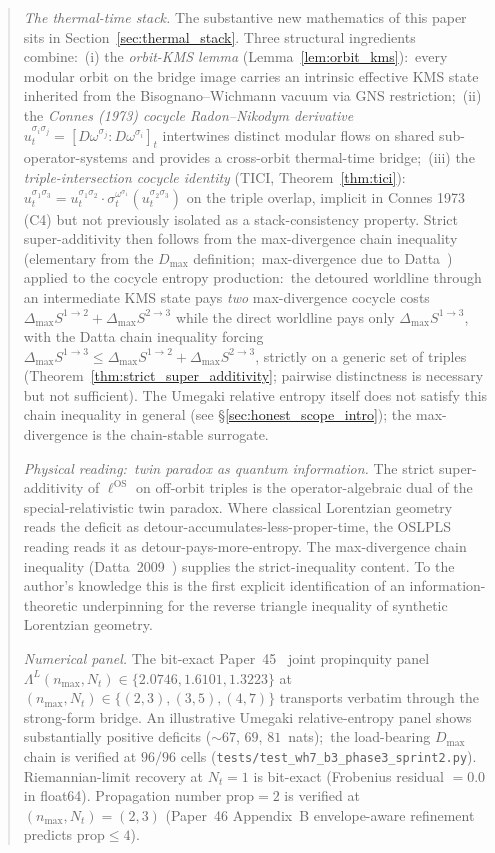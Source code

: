 \documentclass[11pt,a4paper]{article}
\theoremstyle{plain}
\theoremstyle{definition}
\newcommand{\nmax}{n_{\max}}
\newcommand{\Nt}{N_{t}}
\newcommand{\Lprop}{\Lambda^{L}}
\newcommand{\ellOS}{\ell^{\mathrm{OS}}}
\newcommand{\omegaOrb}[1]{\omega^{\sigma_{#1}}}
\newcommand{\cocyc}[2]{u_{t}^{\sigma_{#1}\sigma_{#2}}}
\begin{document}
\begin{abstract}
\noindent\emph{The thermal-time stack.} The substantive new mathematics
of this paper sits in Section~\ref{sec:thermal_stack}. Three structural
ingredients combine:\ (i) the \emph{orbit-KMS lemma}
(Lemma~\ref{lem:orbit_kms}):\ every modular orbit on the bridge image
carries an intrinsic effective KMS state inherited from the
Bisognano--Wichmann vacuum via GNS restriction;\ (ii) the
\emph{Connes (1973) cocycle Radon--Nikodym
derivative}~\cite{connes1973} $\cocyc{i}{j}=[D\omegaOrb{j}:D\omegaOrb{i}]_{t}$
intertwines distinct modular flows on shared sub-operator-systems and
provides a cross-orbit thermal-time bridge;\ (iii) the
\emph{triple-intersection cocycle identity} (TICI,
Theorem~\ref{thm:tici}):\
$\cocyc{1}{3}=\cocyc{1}{2}\cdot\sigma_{t}^{\omegaOrb{1}}(\cocyc{2}{3})$
on the triple overlap, implicit in Connes 1973 (C4) but not previously
isolated as a stack-consistency property. Strict super-additivity then
follows from the max-divergence chain inequality (elementary from the
$D_{\max}$ definition;\ max-divergence due to Datta~\cite{datta2009}) applied to the cocycle
entropy production:\ the detoured worldline through an intermediate
KMS state pays \emph{two} max-divergence cocycle costs
$\Delta_{\max}S^{1\to 2}+\Delta_{\max}S^{2\to 3}$ while the direct
worldline pays only $\Delta_{\max}S^{1\to 3}$, with the Datta chain
inequality forcing
$\Delta_{\max}S^{1\to 3}\le\Delta_{\max}S^{1\to 2}+\Delta_{\max}S^{2\to 3}$,
strictly on a generic set of triples
(Theorem~\ref{thm:strict_super_additivity}; pairwise distinctness is
necessary but not sufficient). The Umegaki relative
entropy itself does not satisfy this chain inequality in general
(see \S\ref{sec:honest_scope_intro}); the max-divergence is the
chain-stable surrogate.

\medskip

\noindent\emph{Physical reading:\ twin paradox as quantum information.}
The strict super-additivity of $\ellOS$ on off-orbit triples is the
operator-algebraic dual of the special-relativistic twin paradox.
Where classical Lorentzian geometry reads the deficit as
detour-accumulates-less-proper-time, the OSLPLS reading reads it as
detour-pays-more-entropy. The max-divergence chain inequality
(Datta~2009~\cite{datta2009}) supplies the strict-inequality content.
To the author's knowledge this is the first explicit
identification of an information-theoretic underpinning for the
reverse triangle inequality of synthetic Lorentzian geometry.

\medskip

\noindent\emph{Numerical panel.} The bit-exact Paper~45~\cite{paper45}
joint propinquity panel
$\Lprop(\nmax,\Nt)\in\{2.0746,1.6101,1.3223\}$ at
$(\nmax,\Nt)\in\{(2,3),(3,5),(4,7)\}$ transports verbatim through the
strong-form bridge. An illustrative Umegaki relative-entropy panel
shows substantially positive deficits ($\sim 67$, $69$, $81$~nats);\
the load-bearing $D_{\max}$ chain is verified at $96/96$ cells
(\texttt{tests/test\_wh7\_b3\_phase3\_sprint2.py}). Riemannian-limit recovery at $\Nt=1$ is
bit-exact (Frobenius residual $=0.0$ in float64). Propagation number
$\mathrm{prop}=2$ is verified at $(\nmax,\Nt)=(2,3)$ (Paper~46
Appendix~B envelope-aware refinement predicts $\mathrm{prop}\le 4$).


\end{abstract}
\end{document}
